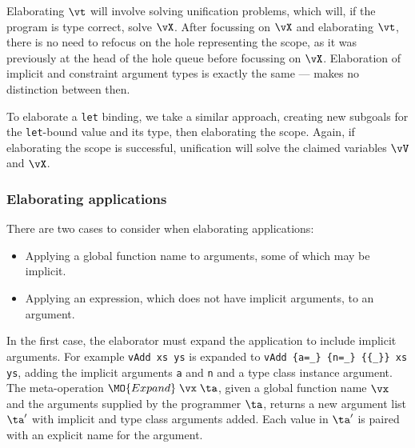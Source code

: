 
Elaborating $\vt$ will involve solving unification problems, which will, if the
program is type correct, solve $\vX$. After focussing on $\vX$ and elaborating
$\vt$, there is no need to refocus on the hole representing the scope, as it was
previously at the head of the hole queue before focussing on $\vX$.
Elaboration of implicit and constraint
argument types is exactly the same --- \TT{} makes no distinction between then.

To elaborate a \texttt{let} binding, we take a similar approach, creating new subgoals
for the \texttt{let}-bound value and its type, then elaborating the scope. Again,
if elaborating the scope is successful, unification will solve the claimed variables
$\vV$ and $\vX$.

\subsubsection{Elaborating applications}

There are two cases to consider when elaborating applications:

\begin{itemize}
\item Applying a global function name to arguments, some of which may be implicit.
\item Applying an expression, which does not have implicit arguments, to an argument.
\end{itemize}

In the first case, the elaborator must expand the application to include implicit arguments.
For example \texttt{vAdd xs ys} is expanded to
\texttt{vAdd \{a=\_\} \{n=\_\} \{\{\_\}\} xs ys}, adding the implicit arguments
\texttt{a} and \texttt{n} and a type class instance argument. The meta-operation
$\MO{Expand}\;\vx\;\ta$, given a global function name $\vx$ and the
arguments supplied by the programmer $\ta$, returns a new argument list
$\ta'$ with implicit and type class arguments added. Each value in
$\ta'$ is paired with an explicit name for the argument.

